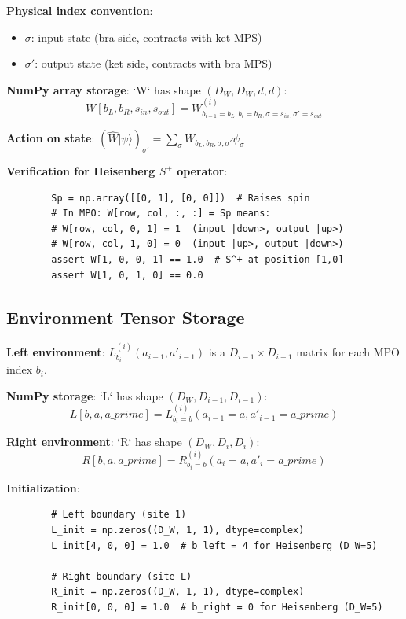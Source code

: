 \documentclass[aps,prb,onecolumn,scriptaddress]{revtex4-2}
\newcommand{\ket}[1]{|#1\rangle}
\begin{document}
	\textbf{Physical index convention}:
	\begin{itemize}
		\item $\sigma$: input state (bra side, contracts with ket MPS)
		\item $\sigma'$: output state (ket side, contracts with bra MPS)
	\end{itemize}
	
	\textbf{NumPy array storage}: `W` has shape $(D_W, D_W, d, d)$:
	\begin{equation}
		\boxed{W[b_L, b_R, s_{in}, s_{out}] = W^{(i)}_{b_{i-1}=b_L, b_i=b_R, \sigma=s_{in}, \sigma'=s_{out}}}
	\end{equation}
	
	\textbf{Action on state}: $(\hat{W}\ket{\psi})_{\sigma'} = \sum_{\sigma} W_{b_L,b_R,\sigma,\sigma'} \psi_{\sigma}$
	
	\textbf{Verification for Heisenberg $S^+$ operator}:
	\begin{verbatim}
		Sp = np.array([[0, 1], [0, 0]])  # Raises spin
		# In MPO: W[row, col, :, :] = Sp means:
		# W[row, col, 0, 1] = 1  (input |down>, output |up>)
		# W[row, col, 1, 0] = 0  (input |up>, output |down>)
		assert W[1, 0, 0, 1] == 1.0  # S^+ at position [1,0]
		assert W[1, 0, 1, 0] == 0.0
	\end{verbatim}
	
	\subsection{Environment Tensor Storage}
	
	\textbf{Left environment}: $L^{(i)}_{b_i}(a_{i-1}, a'_{i-1})$ is a $D_{i-1} \times D_{i-1}$ matrix for each MPO index $b_i$.
	
	\textbf{NumPy storage}: `L` has shape $(D_W, D_{i-1}, D_{i-1})$:
	\begin{equation}
		\boxed{L[b, a, a\_prime] = L^{(i)}_{b_i=b}(a_{i-1}=a, a'_{i-1}=a\_prime)}
	\end{equation}
	
	\textbf{Right environment}: `R` has shape $(D_W, D_i, D_i)$:
	\begin{equation}
		\boxed{R[b, a, a\_prime] = R^{(i)}_{b_i=b}(a_i=a, a'_i=a\_prime)}
	\end{equation}
	
	\textbf{Initialization}:
	\begin{verbatim}
		# Left boundary (site 1)
		L_init = np.zeros((D_W, 1, 1), dtype=complex)
		L_init[4, 0, 0] = 1.0  # b_left = 4 for Heisenberg (D_W=5)
		
		# Right boundary (site L)
		R_init = np.zeros((D_W, 1, 1), dtype=complex)
		R_init[0, 0, 0] = 1.0  # b_right = 0 for Heisenberg (D_W=5)
	\end{verbatim}
	
\end{document}
